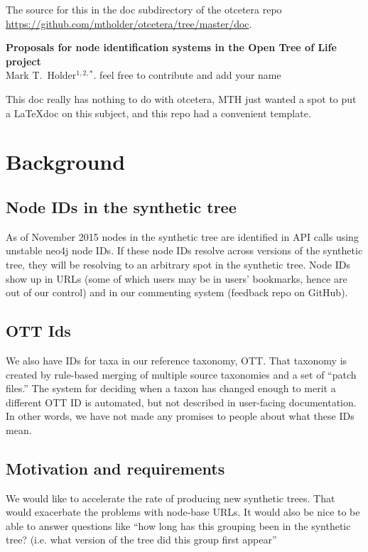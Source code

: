 \documentclass[11pt]{article}
\begin{document}
The source for this in the doc subdirectory of the otcetera
    repo \url{https://github.com/mtholder/otcetera/tree/master/doc}.
\begin{center}
    {\bf Proposals for node identification systems in the Open Tree of Life project} \\
{Mark T.~Holder$^{1,2,\ast}$. feel free to contribute and add your name}
\end{center}
This doc really has nothing to do with otcetera, MTH just wanted a spot to
put a \LaTeX doc on this subject, and this repo had a convenient template.

\tableofcontents
\section{Background}
\subsection{Node IDs in the synthetic tree}
As of November 2015 nodes in the synthetic tree are identified in API calls
    using unstable neo4j node IDs.
If these node IDs resolve across versions of the synthetic tree, they will be
    resolving to an arbitrary spot in the synthetic tree.
Node IDs show up in URLs (some of which users may be in users' bookmarks, hence
    are out of our control) and in our commenting system (feedback repo on GitHub).


\subsection{OTT Ids}
We also have IDs for taxa in our reference taxonomy, OTT.
That taxonomy is created by rule-based merging of multiple source taxonomies and
    a set of ``patch files.''
The system for deciding when a taxon has changed enough to merit a different OTT ID
    is automated, but not described in user-facing documentation.
In other words, we have not made any promises to people about what these IDs mean.

\subsection{Motivation and requirements}
We would like to accelerate the rate of producing new synthetic trees.
That would exacerbate the problems with node-base URLs.
It would also be nice to be able to answer questions like ``how long has this grouping
been in the synthetic tree? (i.e. what version of the tree did this group first appear''
\end{document}

